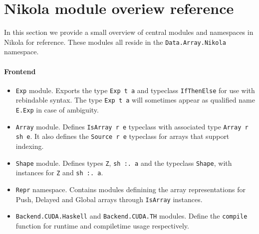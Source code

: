 \section{Nikola module overiew reference}

In this section we provide a small overview of central modules and namespaces
in Nikola for reference. These modules all reside in the
\texttt{Data.Array.Nikola} namespace.

\paragraph{Frontend}
\begin{itemize}

  \item \texttt{Exp} module. Exports the type \texttt{Exp t a} and typeclass
    \texttt{IfThenElse} for use with rebindable syntax. The type \texttt{Exp t
    a} will sometimes appear as qualified name \texttt{E.Exp} in case of
    ambiguity.

  \item \texttt{Array} module. Defines \texttt{IsArray r e} typeclass with
    associated type \texttt{Array r sh e}. It also defines the
    \texttt{Source r e} typeclass for arrays that support indexing.

  \item \texttt{Shape} module. Defines types \texttt{Z}, \texttt{sh :. a}
    and the typeclass \texttt{Shape}, with instances for \texttt{Z} and
    \texttt{sh :. a}.

  \item \texttt{Repr} namespace. Contains modules definining the array
    representations for Push, Delayed and Global arrays through
    \texttt{IsArray} instances.

  \item \texttt{Backend.CUDA.Haskell} and \texttt{Backend.CUDA.TH} modules.
    Define the \texttt{compile} function for runtime and compiletime usage
    respectively.

\end{itemize}

